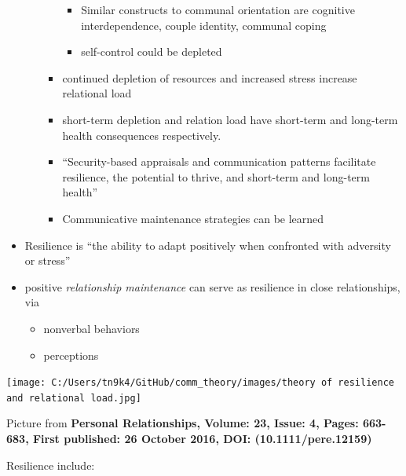 \documentclass[
]{book}
\begin{document}
\begin{itemize}
\begin{itemize}
\begin{itemize}
      \begin{itemize}
      \item
        Similar constructs to communal orientation are cognitive interdependence, couple identity, communal coping
      \item
        self-control could be depleted
      \end{itemize}
    \item
      continued depletion of resources and increased stress increase relational load
    \item
      short-term depletion and relation load have short-term and long-term health consequences respectively.
    \item
      ``Security-based appraisals and communication patterns facilitate resilience, the potential to thrive, and short-term and long-term health''
    \item
      Communicative maintenance strategies can be learned
    \end{itemize}
  \end{itemize}
\item
  Resilience is ``the ability to adapt positively when confronted with adversity or stress'' \citep{2003_3713}
\item
  positive \emph{relationship maintenance} can serve as resilience in close relationships, via

  \begin{itemize}
  \item
    nonverbal behaviors
  \item
    perceptions
  \end{itemize}
\end{itemize}

\texttt{[image: C:/Users/tn9k4/GitHub/comm\_theory/images/theory of resilience and relational load.jpg]}

Picture from \textbf{Personal Relationships, Volume: 23, Issue: 4, Pages: 663-683, First published: 26 October 2016, DOI: (10.1111/pere.12159)}

\citep{Buzzanell_2018}

Resilience include:
\end{document}
